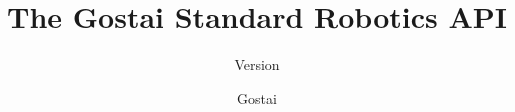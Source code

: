 \documentclass[openright,twoside,11pt]{book}
\title{The Gostai Standard Robotics API}
\subtitle{Version \VcsDescription}
\author{Gostai}
\begin{document}
\maketitle
\tableofcontents
{
  \raisesections
  \let\chapter\section
  
}

\chapterIndex
\end{document}
